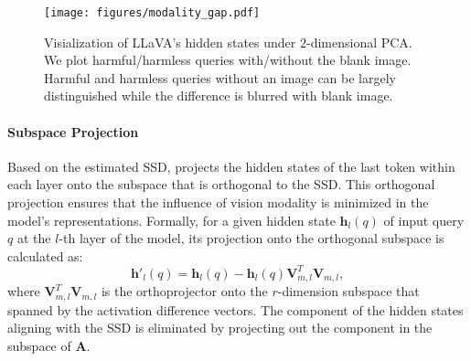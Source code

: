 





\begin{figure}[t]
    \centering
    \texttt{[image: figures/modality\_gap.pdf]}
    \caption{Visialization of LLaVA’s hidden states under $2$-dimensional PCA. We plot harmful/harmless queries with/without the blank image. Harmful and harmless queries without an image can be largely distinguished while the difference is blurred with blank image.}
    \label{fig:gap}
\end{figure}


\paragraph{Subspace Projection}

Based on the estimated SSD, \MODEL projects the hidden states of the last token within each layer onto the subspace that is orthogonal to the SSD.
This orthogonal projection ensures that the influence of vision modality is minimized in the model's representations.
Formally, for a given hidden state $\mathbf{h}_l(q)$ of input query $q$ at the $l$-th layer of the model, its projection onto the orthogonal subspace is calculated as:
\begin{equation}
\mathbf{h}'_l(q) = \mathbf{h}_l(q) - \mathbf{h}_l(q) \mathbf{V}_{m, l} ^T \mathbf{V}_{m, l},
\end{equation}
where $\mathbf{V}_{m, l} ^T \mathbf{V}_{m, l}$ is the orthoprojector onto the $r$-dimension subspace that spanned by the activation difference vectors.
The component of the hidden states aligning with the SSD is eliminated by projecting out the component in the subspace of $\mathbf{A}$.

